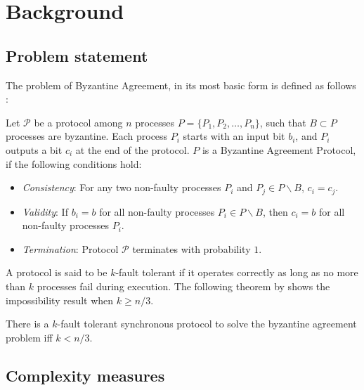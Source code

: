 ﻿\section{Background}
\label{sec:background}

\subsection{Problem statement}
The problem of Byzantine Agreement, in its most basic form is defined as follows \cite{PeaseSL80}:

\begin{definition}
Let $\mathcal{P}$ be a protocol among $n$ processes $P = \{ P_1, P_2, \dots, P_n\}$, such that $B \subset P$ processes are byzantine. Each process $P_i$ starts with an input bit $b_i$, and $P_i$ outputs a bit $c_i$ at the end of the protocol. $P$ is a Byzantine Agreement Protocol, if the following conditions hold:
\begin{itemize}
    \item \textit{Consistency}: For any two non-faulty processes $P_i$ and $P_j \in P \backslash B$, $c_i = c_j$.
    \item \textit{Validity}: If $b_i = b$ for all non-faulty processes $P_i \in P \backslash B$, then $c_i = b$ for all non-faulty processes $P_i$.
    \item \textit{Termination}: Protocol $\mathcal{P}$ terminates with probability $1$.
\end{itemize}
\end{definition}

A protocol is said to be $k$-fault tolerant if it operates correctly as long as no more than $k$ processes fail during execution. The following theorem by \cite{LamportSP82,PeaseSL80} shows the impossibility result when $k \geq n/3$.

\begin{theorem}
There is a $k$-fault tolerant synchronous protocol to solve the byzantine agreement problem iff $k < n/3$.
\end{theorem}

\subsection{Complexity measures}

